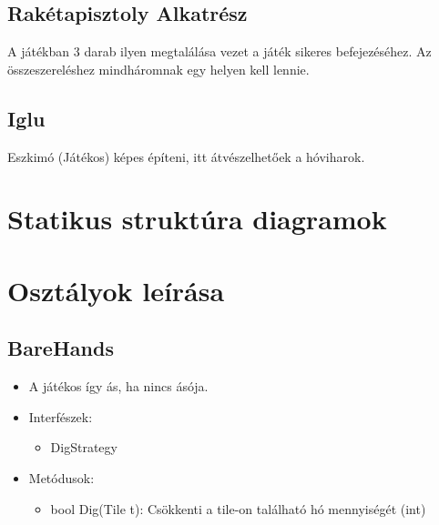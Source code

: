 \subsection{Rakétapisztoly Alkatrész}
A játékban 3 darab ilyen megtalálása vezet a játék sikeres befejezéséhez. Az összeszereléshez mindháromnak egy helyen kell lennie.

\subsection{Iglu}
Eszkimó (Játékos) képes építeni, itt átvészelhetőek a hóviharok.

\newpage
\section{Statikus struktúra diagramok}



\section{Osztályok leírása}

\subsection{BareHands}
\begin{itemize}
\item A játékos így ás, ha nincs ásója.

\item Interfészek:
	\begin{itemize}
		\item DigStrategy
	\end{itemize}

\item Metódusok:
	\begin{itemize}
		\item bool Dig(Tile t): Csökkenti a tile-on található hó mennyiségét (int)
	\end{itemize}
\end{itemize}

